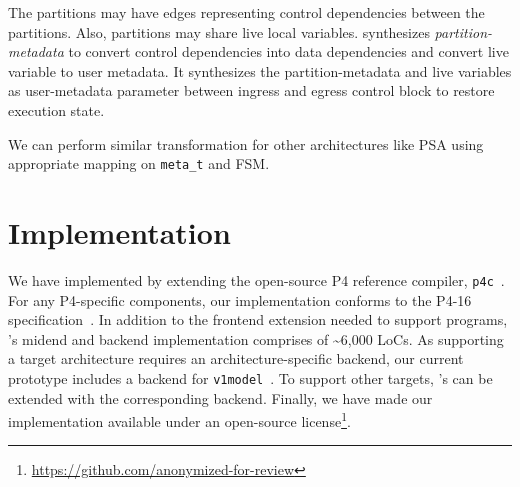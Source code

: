 \documentclass[letterpaper,twocolumn,10pt]{article}
\begin{document}
The partitions may have edges representing control dependencies 
between the partitions. Also, partitions may share live local 
variables. \ucomp synthesizes \emph{partition-metadata} to convert 
control dependencies into data dependencies and convert live variable 
to user metadata. It synthesizes the partition-metadata and live 
variables as user-metadata parameter between ingress and egress 
control block to restore execution state.

We can perform similar transformation for other architectures like 
PSA using appropriate mapping on \texttt{meta\_t} and FSM.






\section{Implementation}
\label{sec:implementation}
We have implemented \ucomp by extending the open-source P4 reference
compiler, \texttt{p4c}~\cite{p4c}. For any P4-specific components, our
implementation conforms to the P4-16 specification~\cite{p4lang}. In
addition to the frontend extension needed to support \ulang programs,
\ucomp's midend and backend implementation comprises of
\textasciitilde 6,000 LoCs. As supporting a target architecture
requires an architecture-specific backend, our current prototype
includes a backend for \texttt{v1model}~\cite{v1model.p4}. To support
other targets, \ucomp's can be extended with the corresponding
backend. Finally, we have made our implementation available under an
open-source
license\footnote{\url{https://github.com/anonymized-for-review}}.
\end{document}
